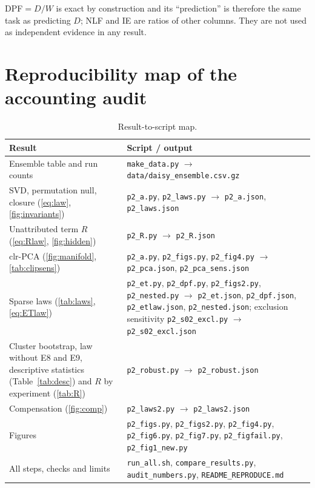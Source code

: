 \documentclass[preprint,12pt,authoryear]{elsarticle}
\begin{document}
DPF$=D/W$ is exact by construction and its ``prediction'' is therefore the same task as predicting $D$; NLF and IE are ratios of other columns. They are not used as independent evidence in any result.

\section{Reproducibility map of the accounting audit}\label{app:reproB}
\begin{table}[H]\centering\footnotesize
\caption{Result-to-script map.}
\begin{tabularx}{\textwidth}{XX}
\toprule
Result & Script / output\\\midrule
Ensemble table and run counts & \texttt{make\_data.py} $\to$ \texttt{data/daisy\_ensemble.csv.gz}\\
SVD, permutation null, closure (\cref{eq:law}, \cref{fig:invariants}) & \texttt{p2\_a.py}, \texttt{p2\_laws.py} $\to$ \texttt{p2\_a.json}, \texttt{p2\_laws.json}\\
Unattributed term $R$ (\cref{eq:Rlaw}, \cref{fig:hidden}) & \texttt{p2\_R.py} $\to$ \texttt{p2\_R.json}\\
clr-PCA (\cref{fig:manifold}, \cref{tab:clipsens}) & \texttt{p2\_a.py}, \texttt{p2\_figs.py}, \texttt{p2\_fig4.py} $\to$ \texttt{p2\_pca.json}, \texttt{p2\_pca\_sens.json}\\
Sparse laws (\cref{tab:laws}, \cref{eq:ETlaw}) & \texttt{p2\_et.py}, \texttt{p2\_dpf.py}, \texttt{p2\_figs2.py}, \texttt{p2\_nested.py} $\to$ \texttt{p2\_et.json}, \texttt{p2\_dpf.json}, \texttt{p2\_etlaw.json}, \texttt{p2\_nested.json}; exclusion sensitivity \texttt{p2\_s02\_excl.py} $\to$ \texttt{p2\_s02\_excl.json}\\
Cluster bootstrap, law without E8 and E9, descriptive statistics (Table~\ref{tab:desc}) and $R$ by experiment (\cref{tab:R}) & \texttt{p2\_robust.py} $\to$ \texttt{p2\_robust.json}\\
Compensation (\cref{fig:comp}) & \texttt{p2\_laws2.py} $\to$ \texttt{p2\_laws2.json}\\
Figures & \texttt{p2\_figs.py}, \texttt{p2\_figs2.py}, \texttt{p2\_fig4.py}, \texttt{p2\_fig6.py}, \texttt{p2\_fig7.py}, \texttt{p2\_figfail.py}, \texttt{p2\_fig1\_new.py}\\
All steps, checks and limits & \texttt{run\_all.sh}, \texttt{compare\_results.py}, \texttt{audit\_numbers.py}, \texttt{README\_REPRODUCE.md}\\\bottomrule
\end{tabularx}
\end{table}




\end{document}
